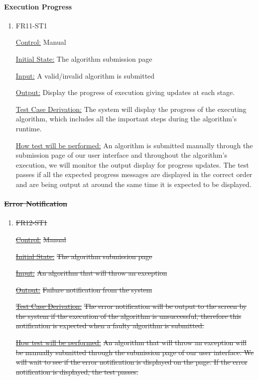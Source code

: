 \documentclass[12pt, titlepage]{article}
\begin{document}
\paragraph{Execution Progress}

\begin{enumerate}

\item{FR11-ST1\\}

\underline{Control:} Manual 

\underline{Initial State:} The algorithm submission page

\underline{Input:} A valid/invalid algorithm is submitted

\underline{Output:} Display the progress of execution giving updates at each stage.

\underline{Test Case Derivation:} The system will display the progress of the executing algorithm, which includes all the important steps during the algorithm’s runtime. 

\underline{How test will be performed:} An algorithm is submitted manually through the submission page of our user interface and throughout the algorithm’s execution, we will monitor the output display for progress updates. The test passes if all the expected progress messages are displayed in the correct order and are being output at around the same time it is expected to be displayed.

\end{enumerate}

\paragraph{\sout{Error Notification}}

\begin{enumerate}

\item{\sout{FR12-ST1}\\}

\underline{\sout{Control:}} \sout{Manual} 

\underline{\sout{Initial State:}} \sout{The algorithm submission page}

\underline{\sout{Input:}} \sout{An algorithm that will throw an exception}

\underline{\sout{Output:}} \sout{Failure notification from the system}

\underline{\sout{Test Case Derivation:}} \sout{The error notification will be output to the screen by the system if the execution of the algorithm is unsuccessful, therefore this notification is expected when a faulty algorithm is submitted.}

\underline{\sout{How test will be performed:}} \sout{An algorithm that will throw an exception will be manually submitted through the submission page of our user interface. We will wait to see if the error notification is displayed on the page. If the error notification is displayed, the test passes.}

\end{enumerate}
\end{document}
